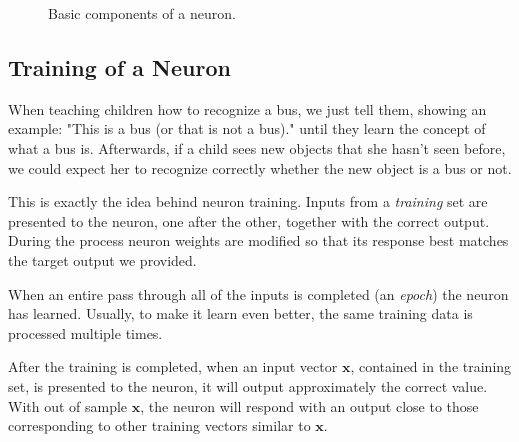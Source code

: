\begin{figure}[htb]
\centering
{}
\caption{Basic components of a neuron.}
\label{fig:sigmoid}
\end{figure}

\subsection{Training of a Neuron}
\label{training-of-a-neuron}

When teaching children how to recognize a bus, we just tell them, showing an example: "This is a bus (or that is not a bus)." until they learn the concept of what a bus is. Afterwards, if a child sees new objects that she hasn't seen before, we could expect her to recognize correctly whether the new object is a bus or not.

This is exactly the idea behind neuron training. Inputs from a \emph{training} set are presented to the neuron, one after the other, together with the correct output. During the process neuron weights are modified so that its response best matches the target output we provided.

When an entire pass through all of the inputs is completed (an \emph{epoch}) the neuron has learned. Usually, to make it learn even better, the same training data is processed multiple times.

After the training is completed, when an input vector $\mathbf{x}$, contained in the training set, is presented to the neuron, it will output approximately the correct value. With out of sample $\mathbf{x}$, the neuron will respond with an output close to those corresponding to other training vectors similar to $\mathbf{x}$.

